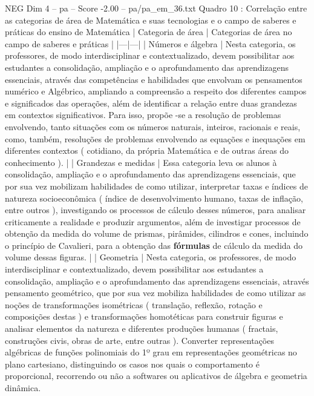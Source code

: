 \begin{textsample}{NEG Dim 4 – pa – Score -2.00 – pa/pa\_em\_36.txt}  \label{ex:f4_neg_275}
Quadro 10 : Correlação entre as categorias de área de Matemática e suas tecnologias e o campo de saberes e práticas do ensino de Matemática | Categoria de área | Categorias de área no campo de saberes e práticas | |---|---| | Números e álgebra | Nesta categoria, os professores, de modo interdisciplinar e contextualizado, devem possibilitar aos estudantes a consolidação, ampliação e o aprofundamento das aprendizagens essenciais, através das competências e habilidades que envolvam os pensamentos numérico e Algébrico, ampliando a compreensão a respeito dos diferentes campos e significados das operações, além de identificar a relação entre duas grandezas em contextos significativos.
Para isso, propõe -se a resolução de problemas envolvendo, tanto situações com os números naturais, inteiros, racionais e reais, como, também, resoluções de problemas envolvendo as equações e inequações em diferentes contextos ( cotidiano, da própria Matemática e de outras áreas do conhecimento ). | | Grandezas e medidas | Essa categoria leva os alunos à consolidação, ampliação e o aprofundamento das aprendizagens essenciais, que por sua vez mobilizam habilidades de como utilizar, interpretar taxas e índices de natureza socioeconômica ( índice de desenvolvimento humano, taxas de inflação, entre outros ), investigando os processos de cálculo desses números, para analisar criticamente a realidade e produzir argumentos, além de investigar processos de obtenção da medida do volume de prismas, pirâmides, cilindros e cones, incluindo o princípio de Cavalieri, para a obtenção das \textbf{fórmulas} de cálculo da medida do volume dessas figuras. | | Geometria | Nesta categoria, os professores, de modo interdisciplinar e contextualizado, devem possibilitar aos estudantes a consolidação, ampliação e o aprofundamento das aprendizagens essenciais, através pensamento geométrico, que por sua vez mobiliza habilidades de como utilizar as noções de transformações isométricas ( translação, reflexão, rotação e composições destas ) e transformações homotéticas para construir figuras e analisar elementos da natureza e diferentes produções humanas ( fractais, construções civis, obras de arte, entre outras ).
Converter representações algébricas de funções polinomiais do 1º grau em representações geométricas no plano cartesiano, distinguindo os casos nos quais o comportamento é proporcional, recorrendo ou não a softwares ou aplicativos de álgebra e geometria dinâmica.

\end{textsample}
